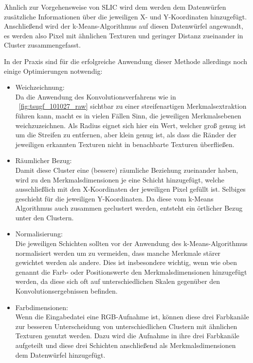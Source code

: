 Ähnlich zur Vorgehensweise von SLIC wird dem werden dem Datenwürfen zusätzliche Informationen über die jeweiligen X- und Y-Koordinaten hinzugefügt. Anschließend wird der k-Means-Algorithmus auf diesen Datenwürfel angewandt, es werden also Pixel mit ähnlichen Texturen und geringer Distanz zueinander in Cluster zusammengefasst.

In der Praxis sind für die erfolgreiche Anwendung dieser Methode allerdings noch einige Optimierungen notwendig: \cite{mathworks_15}

\begin{itemize}
	\item Weichzeichnung:\\
	Da die Anwendung des Konvolutionsverfahrens wie in \figurename~\ref{fig:tsugf_101027_raw} sichtbar zu einer streifenartigen Merkmalsextraktion führen kann, macht es in vielen Fällen Sinn, die jeweiligen Merkmalsebenen weichzuzeichnen. Als Radius eignet sich hier ein Wert, welcher groß genug ist um die Streifen zu entfernen, aber klein genug ist, als dass die Ränder der jeweiligen erkannten Texturen nicht in benachbarte Texturen überfließen.
	\item Räumlicher Bezug:\\
	Damit diese Cluster eine (bessere) räumliche Beziehung zueinander haben, wird zu den Merkmalsdimensionen je eine Schicht hinzugefügt, welche ausschließlich mit den X-Koordinaten der jeweiligen Pixel gefüllt ist. Selbiges geschieht für die jeweiligen Y-Koordinaten. Da diese vom k-Means Algorithmus auch zusammen geclustert werden, entsteht ein örtlicher Bezug unter den Clustern.
	\item Normalisierung:\\
	Die jeweiligen Schichten sollten vor der Anwendung des k-Means-Algorithmus normalisiert werden um zu vermeiden, dass manche Merkmale stärer gewichtet werden als andere. Dies ist insbesondere wichtig, wenn wie oben genannt die Farb- oder Positionswerte den Merkmalsdimensionen hinzugefügt werden, da diese sich oft auf unterschiedlichen Skalen gegenüber den Konvolutionsergebnissen befinden.
	\item Farbdimensionen:\\
	Wenn die Eingabedatei eine RGB-Aufnahme ist, können diese drei Farbkanäle zur besseren Unterscheidung von unterschiedlichen Clustern mit ähnlichen Texturen genutzt werden. Dazu wird die Aufnahme in ihre drei Farbkanäle aufgeteilt und diese drei Schichten anschließend als Merkmalsdimensionen dem Datenwürfel hinzugefügt.
\end{itemize}

